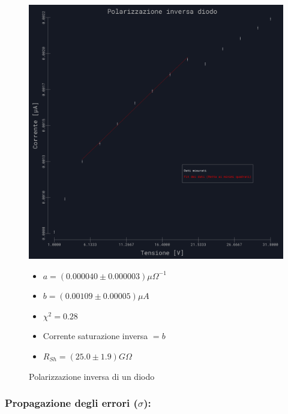 \documentclass{article}
\begin{document}
\begin{figure}[h]
    \begin{minipage}{0.59\textwidth} %
        \centering
        \includegraphics[width=1\linewidth]{../images/grafico4.png} %
        \caption{Polarizzazione inversa di un diodo}
        \label{grafico:4}
    \end{minipage}
    \hfill %
    \begin{minipage}{0.4\textwidth}    
        \begin{itemize}
            \item $a = (0.000040 \pm 0.000003) \mu \Omega^{-1}$
            \item $b = (0.00109 \pm 0.00005) \mu A$
            \item $\chi^2 = 0.28$
            \item Corrente saturazione inversa $= b$
            \item $R_{Sh} = (25.0 \pm 1.9) G\Omega$
        \end{itemize}
    \end{minipage}
\end{figure}

\subsubsection{Propagazione degli errori ($\sigma$): }
\end{document}
